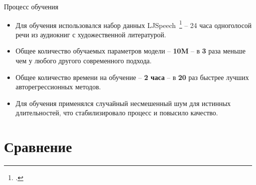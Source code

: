 \begin{frame}{Процесс обучения}
\renewcommand{\thefootnote}{5}
\begin{table}[!ht]
\centering
{}
\caption{Параметры обучения для двух независимых этапов TalkNet}
\end{table}
\vspace{-0.3cm}
\begin{itemize}
    \item Для обучения использовался набор данных LJSpeech~\footcite{ljspeech} -- 24 часа одноголосой речи из аудиокниг с художественной литературой.
    \item Общее количество обучаемых параметров модели -- \textbf{10M} -- в \textbf{3} раза меньше чем у любого другого современного подхода.
    \item Общее количество времени на обучение -- \textbf{2 часа} -- в \textbf{20} раз быстрее лучших авторегрессионных методов.
    \item Для обучения применялся случайный несмешенный шум для истинных длительностей, что стабилизировало процесс и повысило качество.
\end{itemize}
\end{frame}

\section{Сравнение}

